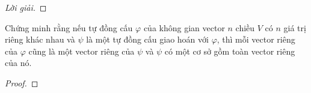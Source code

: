 \documentclass[class=linearalgebra,crop=false]{standalone}
\begin{document}
\begin{proof}[Lời giải]
\end{proof}

\begin{exercise}
    \par Chứng minh rằng nếu tự đồng cấu $\varphi$ của không gian vector $n$ chiều $V$ có $n$ giá trị riêng khác nhau và $\psi$ là một tự đồng cấu giao hoán với $\varphi$, thì mỗi vector riêng của $\varphi$ cũng là một vector riêng của $\psi$ và $\psi$ có một cơ sở gồm toàn vector riêng của nó.
\end{exercise}

\begin{proof}
\end{proof}
\end{document}
